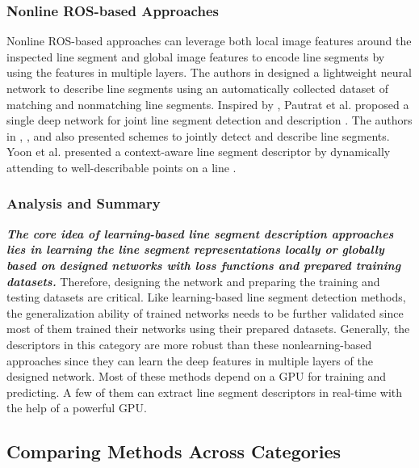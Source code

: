 \documentclass[journal,compsoc]{IEEEtran}
\begin{document}
\subsubsection{Nonline ROS-based Approaches} \label{subsec_description_learning_non_ros} Nonline ROS-based approaches \cite{LearnableLineSegmentDescriptorforVisualSLAM,SOLD2,Superline,LineasaVisualSentenceContextAwareLineDescriptorforVisualLocalization,ELSD,LDAM} can leverage both local image features around the inspected line segment and global image features to encode line segments by using the features in multiple layers. The authors in \cite{LearnableLineSegmentDescriptorforVisualSLAM} designed a lightweight neural network to describe line segments using an automatically collected dataset of matching and nonmatching line segments. Inspired by \cite{SuperPoint}, Pautrat et al. proposed a single deep network for joint line segment detection and description \cite{SOLD2}. The authors in \cite{SOLD2}, \cite{Superline}, and \cite{ELSD} also presented schemes to jointly detect and describe line segments. Yoon et al. presented a context-aware line segment descriptor by dynamically attending to well-describable points on a line \cite{LineasaVisualSentenceContextAwareLineDescriptorforVisualLocalization}.

\subsubsection{Analysis and Summary}
\textbf{\textit{The core idea of learning-based line segment description approaches lies in learning the line segment representations locally or globally based on designed networks with loss functions and prepared training datasets.}} Therefore, designing the network and preparing the training and testing datasets are critical. Like learning-based line segment detection methods, the generalization ability of trained networks needs to be further validated since most of them trained their networks using their prepared datasets. Generally, the descriptors in this category are more robust than these nonlearning-based approaches since they can learn the deep features in multiple layers of the designed network. Most of these methods depend on a GPU for training and predicting. A few of them can extract line segment descriptors in real-time with the help of a powerful GPU.


\subsection{Comparing Methods Across Categories}
\label{subsec_description_comparison}
\end{document}
